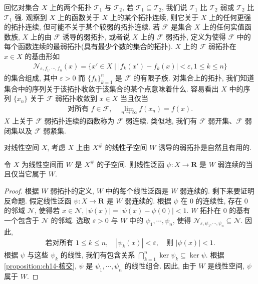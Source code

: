 \documentclass[../../main.tex]{subfiles}
\begin{document}
回忆对集合 $X$ 上的两个拓扑 $\mathcal{T}_{1}$ 与 $\mathcal{T}_{2}$, 若 $\mathcal{T}_{1}\subseteq\mathcal{T}_{2}$, 我们说 $\mathcal{T}_{1}$ 比 $\mathcal{T}_{2}$ 弱或 $\mathcal{T}_{2}$ 比 $\mathcal{T}_{1}$ 强. 观察到 $X$ 上的函数关于 $X$ 上的某个拓扑连续, 则它关于 $X$ 上的任何更强的拓扑连续, 但可能不关于某个较弱的拓扑连续. 若 $\mathcal{F}$ 是集合 $X$ 上的任何实值函数族, $X$ 上的由 $\mathcal{F}$ 诱导的弱拓扑, 或者说 $X$ 上的 $\mathcal{F}$ 弱拓扑, 定义为使得 $\mathcal{F}$ 中的每个函数连续的最弱拓扑(具有最少个数的集合的拓扑). $X$ 上的 $\mathcal{F}$ 弱拓扑在 $x\in X$ 的基由形如
\begin{align}
\mathcal{N}_{\varepsilon,f_{1},\cdots,f_{n}}(x)=\{x'\in X\mid|f_{k}(x')-f_{k}(x)|<\varepsilon,1\leqslant k\leqslant n\}\label{align:ch14-F弱基}
\end{align}
的集合组成, 其中 $\varepsilon>0$ 而 $\{f_{k}\}_{k=1}^{n}$ 是 $\mathcal{F}$ 的有限子族. 对集合上的拓扑, 我们知道集合中的序列关于该拓扑收敛于该集合的某个点意味着什么. 容易看出 $X$ 中的序列 $\{x_{n}\}$ 关于 $\mathcal{F}$ 弱拓扑收敛到 $x\in X$ 当且仅当
\begin{align}
\text{对所有 }f\in\mathcal{F},\quad\lim_{n\to\infty}f(x_{n})=f(x).\label{align:ch14-F弱收敛}
\end{align}
$X$ 上关于 $\mathcal{F}$ 弱拓扑连续的函数称为 $\mathcal{F}$ 弱连续. 类似地, 我们有 $\mathcal{F}$ 弱开集、$\mathcal{F}$ 弱闭集以及 $\mathcal{F}$ 弱紧集.

对线性空间 $X$, 考虑 $X$ 上由 $X^{\#}$ 的线性子空间 $W$ 诱导的弱拓扑是自然且有用的.

\begin{proposition}\label{proposition:ch14-W弱连续}
令 $X$ 为线性空间而 $W$ 是 $X^{\#}$ 的子空间. 则线性泛函 $\psi:X\to\mathbf{R}$ 是 $W$ 弱连续的当且仅当它属于 $W$.
\end{proposition}

\begin{proof}
根据 $W$ 弱拓扑的定义, $W$ 中的每个线性泛函是 $W$ 弱连续的. 剩下来要证明反命题. 假定线性泛函 $\psi:X\to\mathbf{R}$ 是 $W$ 弱连续的. 根据 $\psi$ 在 $0$ 的连续性, 存在 $0$ 的邻域 $\mathcal{N}$, 使得若 $x\in\mathcal{N}$, $|\psi(x)|=|\psi(x)-\psi(0)|<1$. $W$ 拓扑在 $0$ 的基有一个包含于 $\mathcal{N}$ 的邻域. 选取 $\varepsilon>0$ 与 $W$ 中的 $\psi_{1},\cdots,\psi_{n}$, 使得 $\mathcal{N}_{\varepsilon,\psi_{1},\cdots,\psi_{n}}\subseteq\mathcal{N}$. 因此,
\begin{align*}
\text{若对所有 }1\leqslant k\leqslant n,\quad|\psi_{k}(x)|<\varepsilon,\quad\text{则 }|\psi(x)|<1.
\end{align*}
根据 $\psi$ 与这些 $\psi_{k}$ 的线性, 我们有包含关系 $\bigcap_{k=1}^{n}\ker\psi_{k}\subseteq\ker\psi$. 根据\cref{proposition:ch14-核交}, $\psi$ 是 $\psi_{1},\cdots,\psi_{n}$ 的线性组合. 因此, 由于 $W$ 是线性空间, $\psi$ 属于 $W$.
\end{proof}
\end{document}

